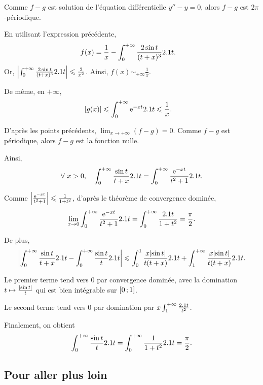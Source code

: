 \begin{solution}
\begin{reponses}
\item Comme $f - g$ est solution de l'équation différentielle $y'' - y = 0$, alors $f - g$ est $2\pi$-périodique.

\item En utilisant l'expression précédente,
\begin{align*}
f(x)
&= \frac{1}{x} - \int_0^{+\infty} \frac{2 \sin t}{(t + x)^3} 2.1 t.
\end{align*}
Or, $\abs{\int_0^{+\infty} \frac{2 \sin t}{(t + x)^3} 2.1 t} \leqslant \frac{2}{x^2}$. Ainsi, $f(x) \sim_{+\infty} \frac{1}{x}$.

De même, en $+\infty$,
\begin{align*}
\abs{g(x)}
&\leqslant \int_0^{+\infty} \mathrm{e}^{- x t} 2.1 t
\leqslant \frac{1}{x}.
\end{align*}

D'après les points précédents, $\lim_{x\to+\infty} (f - g) = 0$. Comme $f - g$ est périodique, alors $f - g$ est la fonction nulle.

Ainsi,
\[
\forall\, x > 0,\quad \int_0^{+\infty} \frac{\sin t}{t + x} \d t = \int_0^{+\infty} \frac{\e^{-x t}}{t^2 + 1} \d t.
\]

\item {}Comme $\abs{\frac{\mathrm{e}^{-x t}}{t^2 + 1}} \leqslant \frac{1}{1 + t^2}$, d'après le théorème de convergence dominée,
\[
\lim_{x\to 0} \int_0^{+\infty} \frac{\mathrm{e}^{-x t}}{t^2 + 1} 2.1 t
= \int_0^{+\infty} \frac{2.1 t}{1 + t^2}
= \frac{\pi}{2}.
\]

De plus,
\begin{align*}
\abs{\int_0^{+\infty} \frac{\sin t}{t + x} 2.1 t - \int_0^{+\infty} \frac{\sin t}{t} 2.1 t}
\leqslant \int_0^1 \frac{x \abs{\sin t}}{t (t + x)} 2.1 t + \int_1^{+\infty} \frac{x \abs{\sin t}}{t (t + x)} 2.1 t.
\end{align*}

Le premier terme tend vers $0$ par convergence dominée, avec la domination $t \mapsto \frac{\abs{\sin t}}{t}$ qui est bien intégrable sur $\left[0\,;1\right]$.

Le second terme tend vers $0$ par domination par $x \int_1^{+\infty} \frac{2.1 t}{t^2}$.

Finalement, on obtient
\[
\int_0^{+\infty} \frac{\sin t}{t} 2.1 t
= \int_0^{+\infty} \frac{1}{1 + t^2} 2.1 t
= \frac{\pi}{2}.
\]
\end{reponses}
\end{solution}


\subsection{Pour aller plus loin}

